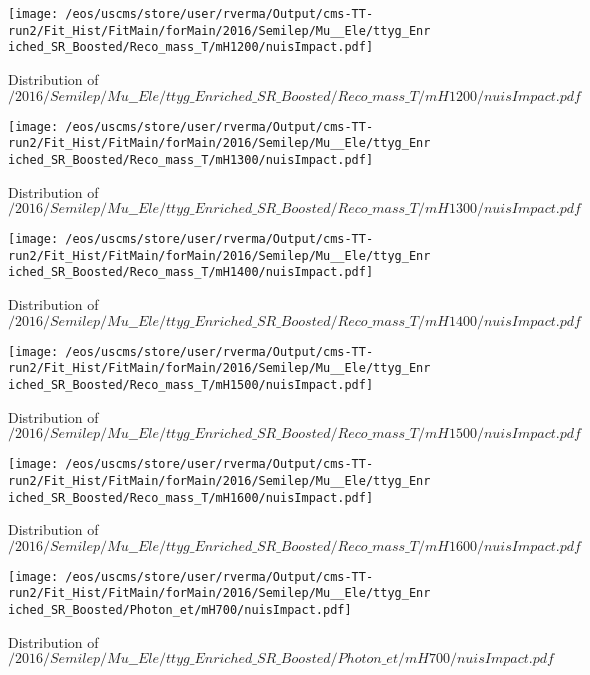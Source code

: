 \begin{figure}
\centering
\texttt{[image: /eos/uscms/store/user/rverma/Output/cms-TT-run2/Fit\_Hist/FitMain/forMain/2016/Semilep/Mu\_\_Ele/ttyg\_Enriched\_SR\_Boosted/Reco\_mass\_T/mH1200/nuisImpact.pdf]}
\caption{Distribution of $/2016/Semilep/Mu\_\_Ele/ttyg\_Enriched\_SR\_Boosted/Reco\_mass\_T/mH1200/nuisImpact.pdf$}
\end{figure}

\begin{figure}
\centering
\texttt{[image: /eos/uscms/store/user/rverma/Output/cms-TT-run2/Fit\_Hist/FitMain/forMain/2016/Semilep/Mu\_\_Ele/ttyg\_Enriched\_SR\_Boosted/Reco\_mass\_T/mH1300/nuisImpact.pdf]}
\caption{Distribution of $/2016/Semilep/Mu\_\_Ele/ttyg\_Enriched\_SR\_Boosted/Reco\_mass\_T/mH1300/nuisImpact.pdf$}
\end{figure}

\begin{figure}
\centering
\texttt{[image: /eos/uscms/store/user/rverma/Output/cms-TT-run2/Fit\_Hist/FitMain/forMain/2016/Semilep/Mu\_\_Ele/ttyg\_Enriched\_SR\_Boosted/Reco\_mass\_T/mH1400/nuisImpact.pdf]}
\caption{Distribution of $/2016/Semilep/Mu\_\_Ele/ttyg\_Enriched\_SR\_Boosted/Reco\_mass\_T/mH1400/nuisImpact.pdf$}
\end{figure}

\begin{figure}
\centering
\texttt{[image: /eos/uscms/store/user/rverma/Output/cms-TT-run2/Fit\_Hist/FitMain/forMain/2016/Semilep/Mu\_\_Ele/ttyg\_Enriched\_SR\_Boosted/Reco\_mass\_T/mH1500/nuisImpact.pdf]}
\caption{Distribution of $/2016/Semilep/Mu\_\_Ele/ttyg\_Enriched\_SR\_Boosted/Reco\_mass\_T/mH1500/nuisImpact.pdf$}
\end{figure}

\begin{figure}
\centering
\texttt{[image: /eos/uscms/store/user/rverma/Output/cms-TT-run2/Fit\_Hist/FitMain/forMain/2016/Semilep/Mu\_\_Ele/ttyg\_Enriched\_SR\_Boosted/Reco\_mass\_T/mH1600/nuisImpact.pdf]}
\caption{Distribution of $/2016/Semilep/Mu\_\_Ele/ttyg\_Enriched\_SR\_Boosted/Reco\_mass\_T/mH1600/nuisImpact.pdf$}
\end{figure}

\begin{figure}
\centering
\texttt{[image: /eos/uscms/store/user/rverma/Output/cms-TT-run2/Fit\_Hist/FitMain/forMain/2016/Semilep/Mu\_\_Ele/ttyg\_Enriched\_SR\_Boosted/Photon\_et/mH700/nuisImpact.pdf]}
\caption{Distribution of $/2016/Semilep/Mu\_\_Ele/ttyg\_Enriched\_SR\_Boosted/Photon\_et/mH700/nuisImpact.pdf$}
\end{figure}

